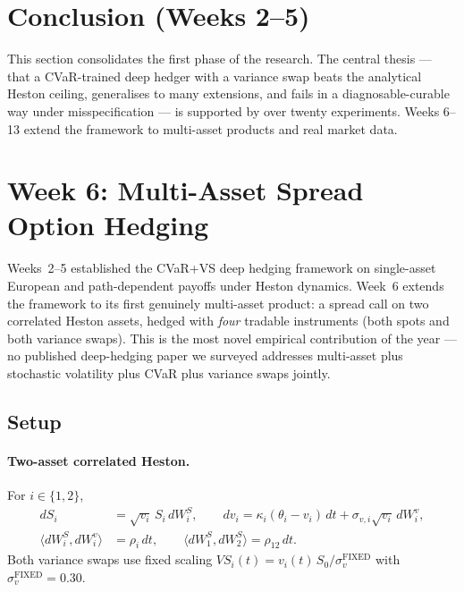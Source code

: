 \documentclass[11pt, a4paper]{article}
\begin{document}
\section{Conclusion (Weeks 2--5)}

This section consolidates the first phase of the research. The central thesis
--- that a CVaR-trained deep hedger with a variance swap beats the analytical
Heston ceiling, generalises to many extensions, and fails in a
diagnosable-curable way under misspecification --- is supported by over twenty
experiments. Weeks 6--13 extend the framework to multi-asset products and real
market data.


\section{Week 6: Multi-Asset Spread Option Hedging}
\label{sec:week6}

Weeks~2--5 established the CVaR+VS deep hedging framework on
single-asset European and path-dependent payoffs under Heston dynamics.
Week~6 extends the framework to its first genuinely multi-asset product:
a spread call on two correlated Heston assets, hedged with
\emph{four} tradable instruments (both spots and both variance swaps).
This is the most novel empirical contribution of the year --- no
published deep-hedging paper we surveyed addresses multi-asset plus
stochastic volatility plus CVaR plus variance swaps jointly.

\subsection{Setup}

\paragraph{Two-asset correlated Heston.} For $i \in \{1,2\}$,
\begin{equation}
\begin{aligned}
dS_i &= \sqrt{v_i}\,S_i\,dW^S_i, \qquad
dv_i = \kappa_i(\theta_i - v_i)\,dt + \sigma_{v,i}\sqrt{v_i}\,dW^v_i, \\
\langle dW^S_i, dW^v_i \rangle &= \rho_i\,dt, \qquad
\langle dW^S_1, dW^S_2 \rangle = \rho_{12}\,dt.
\end{aligned}
\end{equation}
Both variance swaps use fixed scaling
$VS_i(t) = v_i(t)\,S_0 / \sigma_v^{\text{FIXED}}$ with
$\sigma_v^{\text{FIXED}} = 0.30$.
\end{document}
